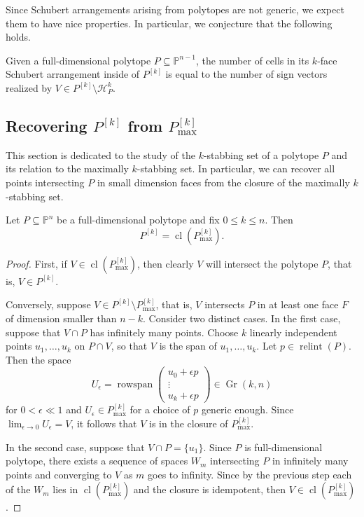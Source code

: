 \documentclass[english]{ourlematema}
\DeclareMathOperator{\Gr}{Gr}
\DeclareMathOperator{\relint}{relint}
\DeclareMathOperator{\cl}{cl}
\DeclareMathOperator{\rowspan}{rowspan}
\newcommand{\PP}{\mathbb{P}}
\newcommand{\Pk}{P^{[k]}}
\newcommand{\Pkmax}{P^{[k]}_{\max}}
\newcommand{\HPk}{\mathcal{H}_P^k}
\begin{document}
Since Schubert arrangements arising from polytopes are not generic, we expect them to have nice properties. In particular, we conjecture that the following holds.
\begin{conj}
    Given a full-dimensional polytope $P\subseteq \PP^{n-1}$, the number of cells in its $k$-face Schubert arrangement inside of $\Pk$ is equal to the number of sign vectors realized by $V\in \Pk\setminus \HPk$.
\end{conj}

\subsection{Recovering $\Pk$ from $\Pkmax$}

This section is dedicated to the study of the $k$-stabbing set of a polytope $P$ and its relation to the maximally $k$-stabbing set. In particular, we can recover all points intersecting $P$ in small dimension faces from the closure of the maximally $k$-stabbing set.

\begin{prop}\label{thm : closure}
    Let $P\subseteq \PP^n$ be a full-dimensional polytope and fix $0\leq k \leq n$. Then 
    \[ \Pk = \cl(\Pkmax). \]
\end{prop}
\begin{proof}
    First, if $V\in \cl(\Pkmax)$, then clearly $V$ will intersect the polytope $P$, that is, $V\in \Pk$.

    Conversely, suppose $V\in \Pk \setminus \Pkmax$, that is, $V$ intersects $P$ in at least one face $F$ of dimension smaller than $n-k$. Consider two distinct cases.
    In the first case, suppose that $V\cap P$ has infinitely many points. Choose $k$ linearly independent points $u_1,\ldots,u_k$ on $P\cap V$, so that $V$ is the span of $u_1,\ldots, u_k$. Let $p\in \relint(P)$. Then the space 
    \[ U_\epsilon = \rowspan\begin{pmatrix}
        u_0 +\epsilon p\\ \vdots \\ u_k +\epsilon p
    \end{pmatrix} \in \Gr(k,n)\]
    for $0<\epsilon\ll 1$ and $U_\epsilon \in \Pkmax$ for a choice of $p$ generic enough. Since $\lim_{\epsilon \to 0} U_\epsilon = V$, it follows that $V$ is in the closure of $\Pkmax$.

    In the second case, suppose that $V\cap P=\{ u_1\}$. Since $P$ is full-dimensional polytope, there exists a sequence of spaces $W_m$ intersecting $P$ in infinitely many points and converging to $V$ as $m$ goes to infinity. Since by the previous step each of the $W_m$ lies in $\cl(\Pkmax)$ and the closure is idempotent, then $V\in \cl(\Pkmax)$.
\end{proof}
\end{document}
